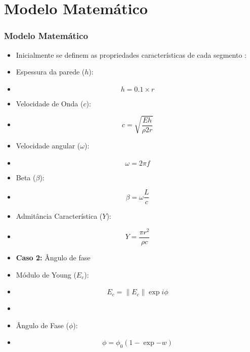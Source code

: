 \documentclass[10pt,aspectratio=169]{beamer}
\theoremstyle{remark}
\theoremstyle{definition}
\begin{document}
	\section{Modelo Matemático}
	\begin{frame}[allowframebreaks]
		\frametitle{Modelo Matemático}
		
		\begin{itemize}
			\item Inicialmente se definem as propriedades características de cada segmento :
			
			\item Espessura da parede ($h$):		
			\item 
					\begin{equation}
					h = 0.1 \times r
					\label{05}
					\end{equation}
			\item Velocidade de Onda ($c$):
			\item 
					\begin{equation}
					 c = \sqrt{\frac{Eh}{\rho 2 r}}
					\label{06}
					\end{equation}
		\end{itemize}
		
		\framebreak
		
		\begin{itemize}
			\item Velocidade angular ($\omega$):
			\item 
					\begin{equation}
					\omega = 2 \pi f
					\label{07}
					\end{equation}
			\item Beta ($\beta$):
			\item 
					\begin{equation}
					 \beta = \omega \frac{L}{c}
					\label{08}
					\end{equation}
			\item Admitância Característica ($Y$):
			\item  
					\begin{equation}
					 Y = \frac{\pi r^2}{\rho c}
					\label{09}
					\end{equation}
			
		\end{itemize}
		
		
		\framebreak
		
		\begin{itemize}
			\item \textbf{Caso 2:} Ângulo de fase
			\item Módulo de Young ($E_c$):
			\item 
					\begin{equation}
					  E_c = \|E_c\|\exp{i\phi}
					\label{12}
					\end{equation}
			\item
			\item Ângulo de Fase ($\phi$):
			\item 
					\begin{equation}
					 \phi = \phi_0 (1 - \exp{-w})
					\label{13}
					\end{equation}
			

\end{itemize}
\end{frame}
\end{document}
